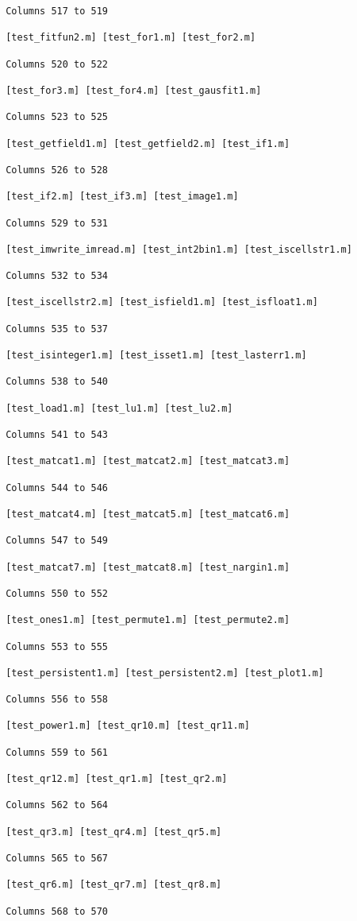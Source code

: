 \begin{verbatim}
 Columns 517 to 519

 [test_fitfun2.m] [test_for1.m] [test_for2.m] 

 Columns 520 to 522

 [test_for3.m] [test_for4.m] [test_gausfit1.m] 

 Columns 523 to 525

 [test_getfield1.m] [test_getfield2.m] [test_if1.m] 

 Columns 526 to 528

 [test_if2.m] [test_if3.m] [test_image1.m] 

 Columns 529 to 531

 [test_imwrite_imread.m] [test_int2bin1.m] [test_iscellstr1.m] 

 Columns 532 to 534

 [test_iscellstr2.m] [test_isfield1.m] [test_isfloat1.m] 

 Columns 535 to 537

 [test_isinteger1.m] [test_isset1.m] [test_lasterr1.m] 

 Columns 538 to 540

 [test_load1.m] [test_lu1.m] [test_lu2.m] 

 Columns 541 to 543

 [test_matcat1.m] [test_matcat2.m] [test_matcat3.m] 

 Columns 544 to 546

 [test_matcat4.m] [test_matcat5.m] [test_matcat6.m] 

 Columns 547 to 549

 [test_matcat7.m] [test_matcat8.m] [test_nargin1.m] 

 Columns 550 to 552

 [test_ones1.m] [test_permute1.m] [test_permute2.m] 

 Columns 553 to 555

 [test_persistent1.m] [test_persistent2.m] [test_plot1.m] 

 Columns 556 to 558

 [test_power1.m] [test_qr10.m] [test_qr11.m] 

 Columns 559 to 561

 [test_qr12.m] [test_qr1.m] [test_qr2.m] 

 Columns 562 to 564

 [test_qr3.m] [test_qr4.m] [test_qr5.m] 

 Columns 565 to 567

 [test_qr6.m] [test_qr7.m] [test_qr8.m] 

 Columns 568 to 570


\end{verbatim}
